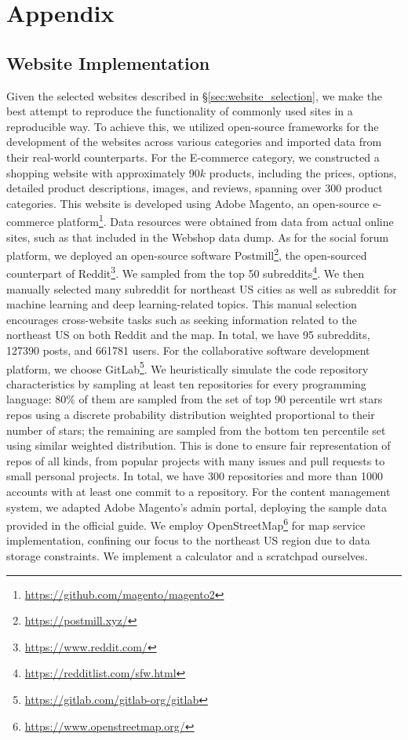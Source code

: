 \section{Appendix}

\subsection{Website Implementation}\label{app:site_implementation}
Given the selected websites described in \S\ref{sec:website_selection}, we make the best attempt to reproduce the functionality of commonly used sites in a reproducible way. 
To achieve this, we utilized open-source frameworks for the development of the websites across various categories and imported data from their real-world counterparts.
For the E-commerce category, we constructed a shopping website with approximately 90$k$ products, including the prices, options, detailed product descriptions, images, and reviews, spanning over 300 product categories. This website is developed using Adobe Magento, an open-source e-commerce platform\footnote{\url{https://github.com/magento/magento2}}. Data resources were obtained from data from actual online sites, such as that included in the Webshop data dump\cite{yao2022webshop}.
As for the social forum platform, we deployed an open-source software Postmill\footnote{\url{https://postmill.xyz/}}, the open-sourced counterpart of Reddit\footnote{\url{https://www.reddit.com/}}.
We sampled from the top 50 subreddits\footnote{\url{https://redditlist.com/sfw.html}}. 
We then manually selected many subreddit for northeast US cities as well as subreddit for machine learning and deep learning-related topics. This manual selection encourages cross-website tasks such as seeking information related to the northeast US on both Reddit and the map. 
In total, we have 95 subreddits, 127390 posts, and 661781 users. 
For the collaborative software development platform, we choose GitLab\footnote{\url{https://gitlab.com/gitlab-org/gitlab}}.
We heuristically simulate the code repository characteristics by sampling at least ten repositories for every programming language: $80\%$ of them are sampled from the set of top $90$ percentile wrt stars repos using a discrete probability distribution weighted proportional to their number of stars; the remaining are sampled from the bottom ten percentile set using similar weighted distribution. This is done to ensure fair representation of repos of all kinds, from popular projects with many issues and pull requests to small personal projects. In total, we have 300 repositories and more than 1000 accounts with at least one commit to a repository.
For the content management system, we adapted Adobe Magento's admin portal, deploying the sample data provided in the official guide.
We employ OpenStreetMap\footnote{\url{https://www.openstreetmap.org/}} for map service implementation, confining our focus to the northeast US region due to data storage constraints.
We implement a calculator and a scratchpad ourselves.

